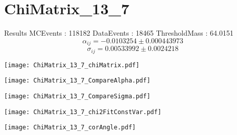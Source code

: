 \documentclass[a4paper,12pt]{article}
\begin{document}
\section{ChiMatrix\_13\_7}
\begin{minipage}{0.49\linewidth} Results \newline
MCEvents : 118182\newline
DataEvents : 18465 \newline
ThresholdMass : 64.0151\\
$$\alpha_{ij} = -0.0103254\pm 0.000443973$$
$$\sigma_{ij} = 0.00533992\pm 0.0024218$$
\end{minipage}\hfill
\begin{minipage}{0.49\linewidth} 
\texttt{[image: ChiMatrix\_13\_7\_chiMatrix.pdf]}\\
\end{minipage}
\hfill
\begin{minipage}{0.49\linewidth} 
\texttt{[image: ChiMatrix\_13\_7\_CompareAlpha.pdf]}\\
\end{minipage}
\hfill
\begin{minipage}{0.49\linewidth} 
\texttt{[image: ChiMatrix\_13\_7\_CompareSigma.pdf]}\\
\end{minipage}
\begin{minipage}{0.49\linewidth} 
\texttt{[image: ChiMatrix\_13\_7\_chi2FitConstVar.pdf]}\\
\end{minipage}
\hfill
\begin{minipage}{0.49\linewidth} 
\texttt{[image: ChiMatrix\_13\_7\_corAngle.pdf]}\\
\end{minipage}
\end{document}
